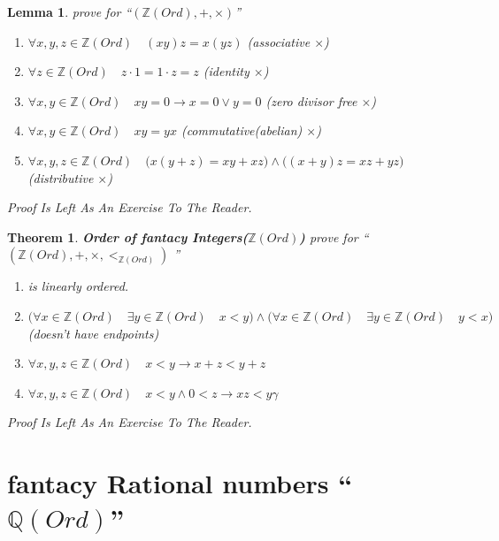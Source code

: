 \documentclass[10pt,a4paper]{book}
\newtheorem{theorem}{Theorem}[section]
\newtheorem{lemma}{Lemma}[section]
\begin{document}
\begin{lemma}prove for  ``$ (\mathbb{Z} (Ord) , + , \times )  $''
    \begin{enumerate}
        \setlength{\itemsep}{0pt} %
        \item       $\forall x ,y ,z  \in \mathbb{Z} (Ord) \quad (x   y )  z  = x  (y   z )  $ (associative $\times$)
        \item       $\forall z \in \mathbb{Z} (Ord) \quad z \cdot 1 = 1 \cdot  z = z$ (identity  $\times$)
        \item       $\forall x ,y   \in \mathbb{Z} (Ord) \quad   x y = 0   \to  x = 0  \lor  y = 0 $ (zero divisor free $\times$)
        \item       $\forall x ,y  \in \mathbb{Z} (Ord) \quad x   y  = y   x $  (commutative(abelian)  $\times$)
        \item       $\forall x ,y ,z  \in \mathbb{Z} (Ord) \quad \Big(x   (y  + z ) = x   y  +  x   z  \Big)
                  \land     \Big((x  + y )  z  = x   z  +  y   z  \Big)  $ (distributive $\times$)
    \end{enumerate}
    Proof Is Left As An Exercise To The Reader.
\end{lemma}

\begin{theorem}
    \textbf{Order of fantacy Integers($\mathbb{Z} (Ord)$)} prove for  ``$ (\mathbb{Z} (Ord) ,+ , \times , <_{\mathbb{Z} (Ord)}  )  $ ''
    \begin{enumerate}
        \setlength{\itemsep}{0pt} %
        \item       is linearly ordered.
        \item       $ \Big( \forall x \in \mathbb{Z} (Ord) \quad   \exists y \in \mathbb{Z} (Ord) \quad  x < y \Big)
                  \land \Big( \forall x \in \mathbb{Z} (Ord) \quad   \exists y \in \mathbb{Z} (Ord) \quad   y < x \Big)  $ (doesn't have endpoints)
        \item       $\forall x ,y ,z \in \mathbb{Z} (Ord) \quad x  < y  \to x  + z < y  + z  $
        \item       $\forall x ,y ,z \in \mathbb{Z} (Ord) \quad x  < y  \land 0 < z \to x  z < y  \gamma   $
    \end{enumerate}
    Proof Is Left As An Exercise To The Reader.
\end{theorem}

\section{fantacy Rational numbers ``$\mathbb{Q} (Ord) $''}
\end{document}
